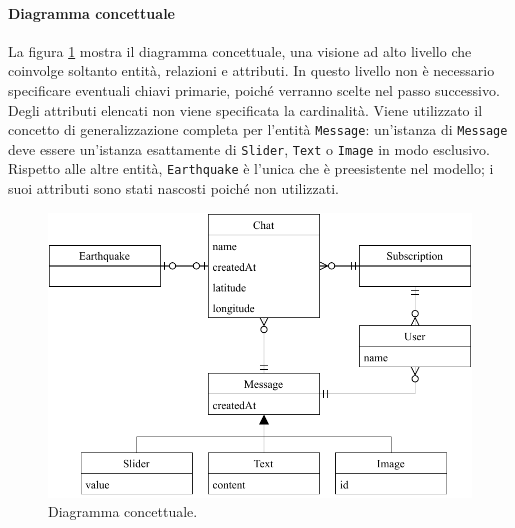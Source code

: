 \paragraph{Diagramma concettuale} La figura \ref{fig:diagramma_concettuale} mostra il diagramma concettuale, una visione ad alto livello che coinvolge soltanto entità, relazioni e attributi. In questo livello non è necessario specificare eventuali chiavi primarie, poiché verranno scelte nel passo successivo. Degli attributi elencati non viene specificata la cardinalità. Viene utilizzato il concetto di generalizzazione completa per l'entità \texttt{Message}: un'istanza di \texttt{Message} deve essere un'istanza esattamente di \texttt{Slider}, \texttt{Text} o \texttt{Image} in modo esclusivo. Rispetto alle altre entità, \texttt{Earthquake} è l'unica che è preesistente nel modello; i suoi attributi sono stati nascosti poiché non utilizzati.

\begin{figure}[ht!]
\centering
\includegraphics[width=\textwidth]{assets/03/concettuale.pdf}
\caption{Diagramma concettuale.}
\label{fig:diagramma_concettuale}
\end{figure}

